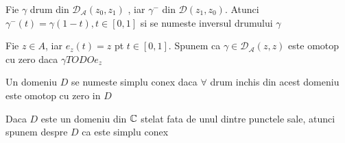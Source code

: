 \begin{definition}
    Fie $\gamma$ drum din $\mathcal{D_{A}}(z_0,z_1)$ , iar $\gamma^-$ din
    $\mathcal{D}(z_1,z_0)$. Atunci $\gamma^-(t) = \gamma(1-t), t\in[0,1]$ si
    se numeste inversul drumului $\gamma$
\end{definition}

\begin{definition}
    Fie $z\in A$, iar $e_z(t)=z$ pt $t\in[0,1]$. Spunem ca $\gamma \in
    \mathcal{D_{A}}(z,z)$ este omotop cu zero daca $\gamma TODO e_z$
\end{definition}

\begin{definition}
    Un domeniu $D$ se numeste simplu conex daca $\forall$ drum inchis din acest
     domeniu este omotop cu zero in $D$
\end{definition}

\begin{observation}
    Daca $D$ este un domeniu din $\mathbb{C}$ stelat fata de unul dintre punctele sale,
    atunci spunem despre $D$ ca este simplu conex
\end{observation}